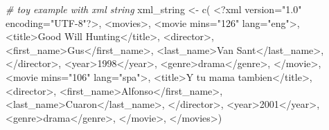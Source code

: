 \documentclass[
]{book}
\newenvironment{Shaded}{\begin{snugshade}}{\end{snugshade}}
\newcommand{\CommentTok}[1]{\textcolor[rgb]{0.56,0.35,0.01}{\textit{#1}}}
\newcommand{\FunctionTok}[1]{\textcolor[rgb]{0.00,0.00,0.00}{#1}}
\newcommand{\NormalTok}[1]{#1}
\newcommand{\OtherTok}[1]{\textcolor[rgb]{0.56,0.35,0.01}{#1}}
\newcommand{\StringTok}[1]{\textcolor[rgb]{0.31,0.60,0.02}{#1}}
\begin{document}
\begin{Shaded}
\begin{Highlighting}[]
\CommentTok{\# toy example with xml string}
\NormalTok{xml\_string }\OtherTok{\textless{}{-}} \FunctionTok{c}\NormalTok{(}
  \StringTok{\textquotesingle{}\textless{}?xml version="1.0" encoding="UTF{-}8"?\textgreater{}\textquotesingle{}}\NormalTok{,}
  \StringTok{\textquotesingle{}\textless{}movies\textgreater{}\textquotesingle{}}\NormalTok{,}
  \StringTok{\textquotesingle{}\textless{}movie mins="126" lang="eng"\textgreater{}\textquotesingle{}}\NormalTok{,}
  \StringTok{\textquotesingle{}\textless{}title\textgreater{}Good Will Hunting\textless{}/title\textgreater{}\textquotesingle{}}\NormalTok{,}
  \StringTok{\textquotesingle{}\textless{}director\textgreater{}\textquotesingle{}}\NormalTok{,}
  \StringTok{\textquotesingle{}\textless{}first\_name\textgreater{}Gus\textless{}/first\_name\textgreater{}\textquotesingle{}}\NormalTok{,}
  \StringTok{\textquotesingle{}\textless{}last\_name\textgreater{}Van Sant\textless{}/last\_name\textgreater{}\textquotesingle{}}\NormalTok{,}
  \StringTok{\textquotesingle{}\textless{}/director\textgreater{}\textquotesingle{}}\NormalTok{,}
  \StringTok{\textquotesingle{}\textless{}year\textgreater{}1998\textless{}/year\textgreater{}\textquotesingle{}}\NormalTok{,}
  \StringTok{\textquotesingle{}\textless{}genre\textgreater{}drama\textless{}/genre\textgreater{}\textquotesingle{}}\NormalTok{,}
  \StringTok{\textquotesingle{}\textless{}/movie\textgreater{}\textquotesingle{}}\NormalTok{,}
  \StringTok{\textquotesingle{}\textless{}movie mins="106" lang="spa"\textgreater{}\textquotesingle{}}\NormalTok{,}
  \StringTok{\textquotesingle{}\textless{}title\textgreater{}Y tu mama tambien\textless{}/title\textgreater{}\textquotesingle{}}\NormalTok{,}
  \StringTok{\textquotesingle{}\textless{}director\textgreater{}\textquotesingle{}}\NormalTok{,}
  \StringTok{\textquotesingle{}\textless{}first\_name\textgreater{}Alfonso\textless{}/first\_name\textgreater{}\textquotesingle{}}\NormalTok{,}
  \StringTok{\textquotesingle{}\textless{}last\_name\textgreater{}Cuaron\textless{}/last\_name\textgreater{}\textquotesingle{}}\NormalTok{,}
  \StringTok{\textquotesingle{}\textless{}/director\textgreater{}\textquotesingle{}}\NormalTok{,}
  \StringTok{\textquotesingle{}\textless{}year\textgreater{}2001\textless{}/year\textgreater{}\textquotesingle{}}\NormalTok{,}
  \StringTok{\textquotesingle{}\textless{}genre\textgreater{}drama\textless{}/genre\textgreater{}\textquotesingle{}}\NormalTok{,}
  \StringTok{\textquotesingle{}\textless{}/movie\textgreater{}\textquotesingle{}}\NormalTok{,}
  \StringTok{\textquotesingle{}\textless{}/movies\textgreater{}\textquotesingle{}}\NormalTok{)}
\end{Highlighting}
\end{Shaded}
\end{document}
